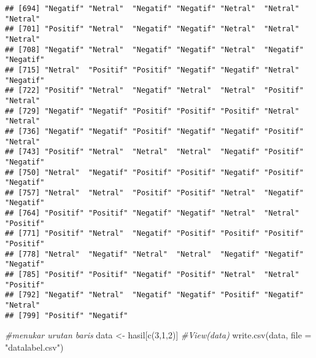 \documentclass[
]{article}
\newenvironment{Shaded}{\begin{snugshade}}{\end{snugshade}}
\newcommand{\AttributeTok}[1]{\textcolor[rgb]{0.77,0.63,0.00}{#1}}
\newcommand{\CommentTok}[1]{\textcolor[rgb]{0.56,0.35,0.01}{\textit{#1}}}
\newcommand{\DecValTok}[1]{\textcolor[rgb]{0.00,0.00,0.81}{#1}}
\newcommand{\FunctionTok}[1]{\textcolor[rgb]{0.00,0.00,0.00}{#1}}
\newcommand{\NormalTok}[1]{#1}
\newcommand{\OtherTok}[1]{\textcolor[rgb]{0.56,0.35,0.01}{#1}}
\newcommand{\StringTok}[1]{\textcolor[rgb]{0.31,0.60,0.02}{#1}}
\begin{document}
\begin{verbatim}
## [694] "Negatif" "Netral"  "Negatif" "Negatif" "Netral"  "Netral"  "Netral" 
## [701] "Positif" "Netral"  "Negatif" "Negatif" "Netral"  "Netral"  "Netral" 
## [708] "Negatif" "Netral"  "Negatif" "Negatif" "Netral"  "Negatif" "Negatif"
## [715] "Netral"  "Positif" "Positif" "Negatif" "Negatif" "Netral"  "Negatif"
## [722] "Positif" "Netral"  "Negatif" "Netral"  "Netral"  "Positif" "Netral" 
## [729] "Negatif" "Negatif" "Positif" "Positif" "Positif" "Netral"  "Netral" 
## [736] "Negatif" "Negatif" "Positif" "Negatif" "Negatif" "Positif" "Netral" 
## [743] "Positif" "Netral"  "Netral"  "Netral"  "Negatif" "Positif" "Negatif"
## [750] "Netral"  "Negatif" "Positif" "Positif" "Negatif" "Positif" "Negatif"
## [757] "Netral"  "Netral"  "Positif" "Positif" "Netral"  "Negatif" "Negatif"
## [764] "Positif" "Positif" "Negatif" "Negatif" "Netral"  "Netral"  "Positif"
## [771] "Positif" "Netral"  "Negatif" "Positif" "Positif" "Positif" "Positif"
## [778] "Netral"  "Negatif" "Netral"  "Netral"  "Negatif" "Negatif" "Negatif"
## [785] "Positif" "Positif" "Negatif" "Positif" "Netral"  "Netral"  "Positif"
## [792] "Negatif" "Netral"  "Negatif" "Negatif" "Positif" "Negatif" "Netral" 
## [799] "Positif" "Negatif"
\end{verbatim}

\begin{Shaded}
\begin{Highlighting}[]
\CommentTok{\#menukar urutan baris}
\NormalTok{data }\OtherTok{\textless{}{-}}\NormalTok{ hasil[}\FunctionTok{c}\NormalTok{(}\DecValTok{3}\NormalTok{,}\DecValTok{1}\NormalTok{,}\DecValTok{2}\NormalTok{)]}
\CommentTok{\#View(data)}
\FunctionTok{write.csv}\NormalTok{(data, }\AttributeTok{file =} \StringTok{"datalabel.csv"}\NormalTok{)}
\end{Highlighting}
\end{Shaded}
\end{document}
